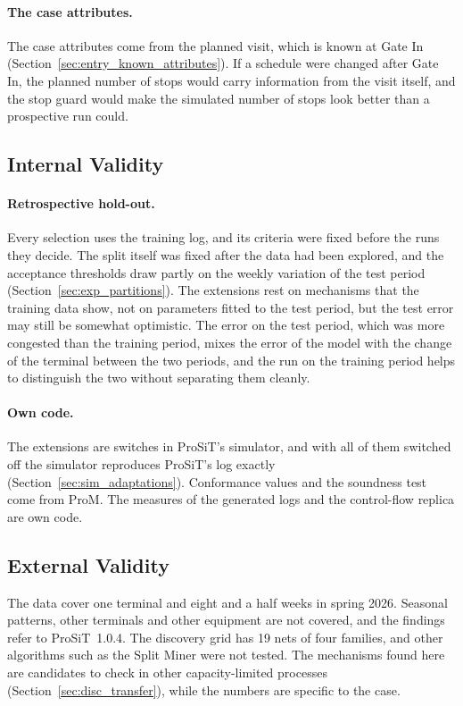 \paragraph{The case attributes.} The case attributes come from the planned visit,
which is known at Gate In (Section~\ref{sec:entry_known_attributes}). If a schedule
were changed after Gate In, the planned number of stops would carry information from
the visit itself, and the stop guard would make the simulated number of stops look
better than a prospective run could.

\subsection{Internal Validity}
\paragraph{Retrospective hold-out.} Every selection uses the training log, and its
criteria were fixed before the runs they decide. The split itself was fixed after the
data had been explored, and the acceptance thresholds draw partly on the weekly
variation of the test period (Section~\ref{sec:exp_partitions}). The extensions rest
on mechanisms that the training data show, not on parameters fitted to the test
period, but the test error may still be somewhat optimistic. The error on the
test period, which was more congested than the training period, mixes the error of
the model with the change of the terminal between the two periods, and the run on the
training period helps to distinguish the two without separating them cleanly.

\paragraph{Own code.} The extensions are switches in ProSiT's simulator, and with all
of them switched off the simulator reproduces ProSiT's log exactly
(Section~\ref{sec:sim_adaptations}). Conformance values and the soundness test come
from ProM. The measures of the generated logs and the control-flow replica are own
code.

\subsection{External Validity}
The data cover one terminal and eight and a half weeks in spring 2026. Seasonal
patterns, other terminals and other equipment are not covered, and the findings refer
to ProSiT~1.0.4. The discovery grid has 19 nets of four families, and other
algorithms such as the Split Miner \cite{RWSplitMiner2019} were not tested. The
mechanisms found here are candidates to check in other capacity-limited processes
(Section~\ref{sec:disc_transfer}), while the numbers are specific to the case.

